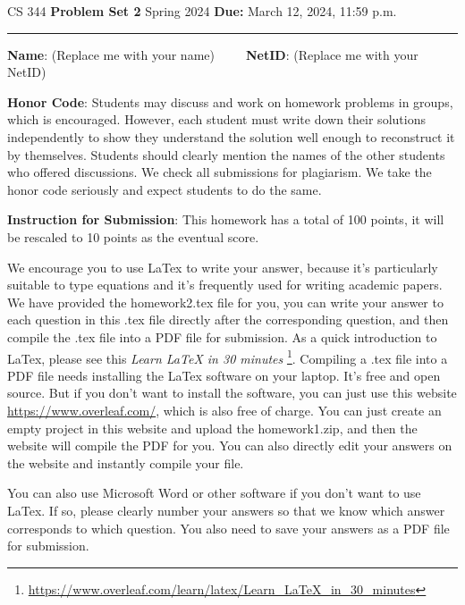 \documentclass[12pt]{article}
\begin{document}
\noindent
CS 344 \hfill \textbf{Problem Set 2} \newline 
{Spring 2024} \hfill \textbf{Due:} March 12, 2024, 11:59 p.m.

\noindent
\rule{\linewidth}{0.4pt}

\vspace{.5cm}

\textbf{Name}: ({\color{blue}Replace me with your name})~~~~~\textbf{NetID}: ({\color{blue}Replace me with your NetID})

\vspace{.5cm}

\textbf{Honor Code}: Students may discuss and work on homework problems in groups, which is encouraged. However, each student must write down their solutions independently to show they understand the solution well enough to reconstruct it by themselves.  Students should clearly mention the names of the other students who offered discussions. We check all submissions for plagiarism. We take the honor code seriously and expect students to do the same.


\vspace{.5cm}

\textbf{Instruction for Submission}: This homework has a total of 100 points, it will be rescaled to 10 points as the eventual score. 

We encourage you to use LaTex to write your answer, because it's particularly suitable to type equations and it's frequently used for writing academic papers. We have provided the homework2.tex file for you, you can write your answer to each question in this .tex file directly after the corresponding question, and then compile the .tex file into a PDF file for submission. As a quick introduction to LaTex, please see this \textit{Learn LaTeX in 30 minutes} \footnote{\url{https://www.overleaf.com/learn/latex/Learn_LaTeX_in_30_minutes}}. Compiling a .tex file into a PDF file needs installing the LaTex software on your laptop. It's free and open source. But if you don't want to install the software, you can just use this website \url{https://www.overleaf.com/}, which is also free of charge. You can just create an empty project in this website and upload the homework1.zip, and then the website will compile the PDF for you. You can also directly edit your answers on the website and instantly compile your file.

You can also use Microsoft Word or other software if you don't want to use LaTex. If so, please clearly number your answers so that we know which answer corresponds to which question. You also need to save your answers as a PDF file for submission.
\end{document}
